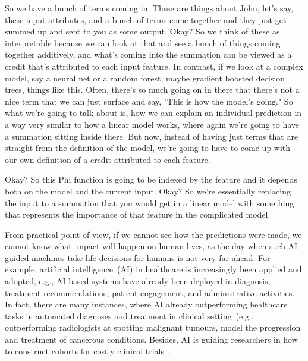 So we have a bunch of terms coming in. These are things about John, let's say, these input attributes, and a bunch of terms come together and they just get summed up and sent to you as some output.
Okay? So we think of these as interpretable because we can look at that and see a bunch of things coming together additively,
and what's coming into the summation can be viewed as a credit that's attributed to each input feature.
In contrast, if we look at a complex model, say a neural net or a random forest, maybe gradient boosted decision trees, things like this.
Often, there's so much going on in there that there's not a nice term that we can just surface and say,
"This is how the model's going." So what we're going to talk about is, how we can explain an individual prediction in a way very similar to how a linear model works, where again we're going to have a summation sitting inside there.
But now, instead of having just terms that are straight from the definition of the model, we're going to have to come up with our own definition
of a credit attributed to each feature.

Okay? So this Phi function is going to be indexed by the feature and it depends both on the model and the current input.
Okay? So we're essentially replacing the input to a summation that you would get in a linear model with something that
represents the importance of that feature in the complicated model.

\hspace*{3.5mm} From practical point of view, if we cannot see how the predictions were made, we cannot know what impact will happen on human lives, as the day when such AI-guided machines take life decisions for humans is not very far ahead. For example, artificial intelligence~(AI) in healthcare is increasingly been applied and adopted, e.g., AI-based systems have already been deployed in diagnosis, treatment recommendations, patient engagement, and administrative activities. In fact, there are many instances, where AI already outperforming healthcare tasks in automated diagnoses and treatment in clinical setting~(e.g., outperforming radiologists at spotting malignant tumours, model the progression and treatment of cancerous conditions. Besides, AI is guiding researchers in how to construct cohorts for costly clinical trials~\cite{davenport2019potential}. 

